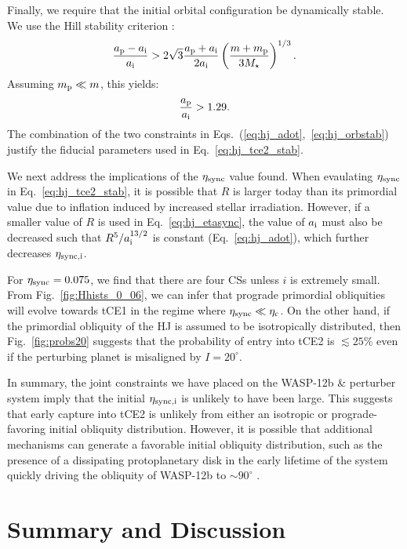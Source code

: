 \documentclass[
        fleqn,
        usenatbib,
        referee,
    ]{mnras}
\newcommand*{\p}[1]{\left(#1\right)}
\begin{document}
Finally, we require that the initial orbital configuration be dynamically
stable. We use the Hill stability criterion \citep[e.g.][]{petit2020path}:
\begin{equation}
    \frac{a_{\rm p} - a_{\rm i}}{a_{\rm i}} > 2\sqrt{3}\frac{a_{\rm p} + a_{\rm
        i}}{2a_{\rm i}} \p{\frac{m + m_{\rm p}}{3M_{\star}}}^{1/3}.
\end{equation}
Assuming $m_{\rm p} \ll m$, this yields:
\begin{equation}
    \frac{a_{\rm p}}{a_{\rm i}} > 1.29.\label{eq:hj_orbstab}
\end{equation}
The combination of the two constraints in
Eqs.~(\ref{eq:hj_adot},~\ref{eq:hj_orbstab}) justify the fiducial parameters
used in Eq.~\eqref{eq:hj_tce2_stab}.

We next address the implications of the $\eta_{\rm sync}$ value found. When
evaulating $\eta_{\rm sync}$ in Eq.~\eqref{eq:hj_tce2_stab}, it is possible
that $R$ is larger today than its primordial value due to inflation induced by
increased stellar irradiation. However, if a smaller value of $R$ is used in
Eq.~\eqref{eq:hj_etasync}, the value of $a_{\rm i}$ must also be decreased such
that $R^5 / a_{\rm i}^{13/2}$ is constant (Eq.~\ref{eq:hj_adot}), which further
decreases $\eta_{\rm sync, i}$.

For $\eta_{\rm sync} = 0.075$, we find that there are four CSs unless $i$ is
extremely small. From Fig.~\ref{fig:Hhists_0_06}, we can infer that prograde
primordial obliquities will evolve towards tCE1 in the regime where $\eta_{\rm
sync} \ll \eta_{\rm c}$. On the other hand, if the primordial obliquity of the
HJ is assumed to be isotropically distributed, then Fig.~\ref{fig:probs20}
suggests that the probability of entry into tCE2 is $\lesssim 25\%$ even if
the perturbing planet is misaligned by $I = 20^\circ$.

In summary, the joint constraints we have placed on the WASP-12b \& perturber
system imply that the initial $\eta_{\rm sync, i}$ is unlikely to have been
large. This suggests that early capture into tCE2 is unlikely from either an
isotropic or prograde-favoring initial obliquity distribution. However, it is
possible that additional mechanisms can generate a favorable initial obliquity
distribution, such as the presence of a dissipating protoplanetary disk in the
early lifetime of the system quickly driving the obliquity of WASP-12b to $\sim
90^\circ$ \citep{millholland_disk, su2020}.

\section{Summary and Discussion}\label{s:summary}
\end{document}
